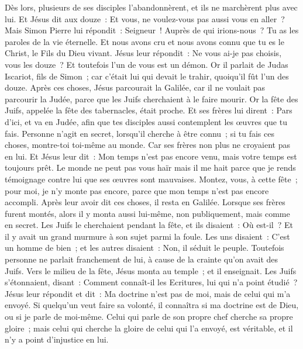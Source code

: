 \begin{multicols}{2}
Dès lors, plusieurs de ses disciples l'abandonnèrent, et ils ne marchèrent plus avec lui.
Et Jésus dit aux douze~: Et vous, ne voulez-vous pas aussi vous en aller~?
Mais Simon Pierre lui répondit~: Seigneur~! Auprès de qui irions-nous~? Tu as les paroles de la vie éternelle.
Et nous avons cru et nous avons connu que tu es le Christ, le Fils du Dieu vivant.
Jésus leur répondit~: Ne vous ai-je pas choisis, vous les douze~? Et toutefois l'un de vous est un démon.
Or il parlait de Judas Iscariot, fils de Simon~; car c'était lui qui devait le trahir, quoiqu'il fût l'un des douze.
\VerseOne{}Après ces choses, Jésus parcourait la Galilée, car il ne voulait pas parcourir la Judée, parce que les Juifs cherchaient à le faire mourir.
Or la fête des Juifs, appelée la fête des tabernacles, était proche.
Et ses frères lui dirent~: Pars d'ici, et va en Judée, afin que tes disciples aussi contemplent les œuvres que tu fais.
Personne n'agit en secret, lorsqu'il cherche à être connu~; si tu fais ces choses, montre-toi toi-même au monde.
Car ses frères non plus ne croyaient pas en lui.
Et Jésus leur dit~: Mon temps n'est pas encore venu, mais votre temps est toujours prêt.
Le monde ne peut pas vous haïr mais il me hait parce que je rends témoignage contre lui que ses œuvres sont mauvaises.
Montez, vous, à cette fête~; pour moi, je n'y monte pas encore, parce que mon temps n'est pas encore accompli.
Après leur avoir dit ces choses, il resta en Galilée.
Lorsque ses frères furent montés, alors il y monta aussi lui-même, non publiquement, mais comme en secret.
Les Juifs le cherchaient pendant la fête, et ils disaient~: Où est-il~?
Et il y avait un grand murmure à son sujet parmi la foule. Les uns disaient~: C'est un homme de bien~; et les autres disaient~: Non, il séduit le peuple.
Toutefois personne ne parlait franchement de lui, à cause de la crainte qu'on avait des Juifs.
Vers le milieu de la fête, Jésus monta au temple~; et il enseignait.
Les Juifs s'étonnaient, disant~: Comment connaît-il les Ecritures, lui qui n'a point étudié~?
Jésus leur répondit et dit~: Ma doctrine n'est pas de moi, mais de celui qui m'a envoyé.
Si quelqu'un veut faire sa volonté, il connaîtra si ma doctrine est de Dieu, ou si je parle de moi-même.
Celui qui parle de son propre chef cherche sa propre gloire~; mais celui qui cherche la gloire de celui qui l'a envoyé, est véritable, et il n'y a point d'injustice en lui.

\end{multicols}

